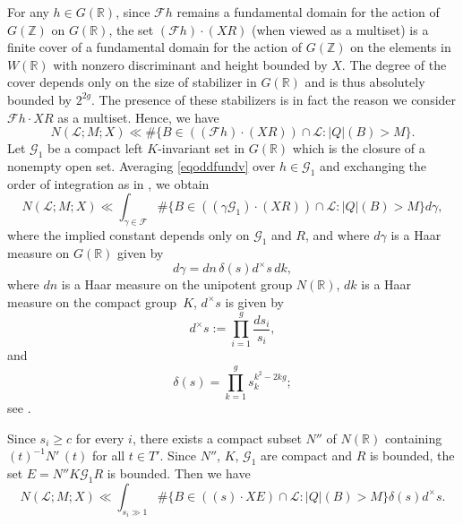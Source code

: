 \documentclass[11pt]{article}
\def\Z{{\mathbb Z}}
\def\R{{\mathbb R}}
\def\FF{{\mathcal F}}
\def\Z{{\mathbb Z}}
\def\GG{{\mathcal G}}
\def\LL{{\mathcal L}}
\begin{document}
For any $h\in G(\R)$, since $\FF h$ remains a fundamental domain for
the action of $G(\Z)$ on $G(\R)$, the set $(\FF h)\cdot (XR)$ (when
viewed as a multiset) is a finite cover of a fundamental domain for
the action of $G(\Z)$ on the elements in $W(\R)$ with nonzero
discriminant and height bounded by $X$. The degree of the cover
depends only on the size of stabilizer in $G(\R)$ and is thus
absolutely bounded by $2^{2g}$. The presence of these stabilizers is
in fact the reason we consider $\FF h\cdot XR$ as a multiset. Hence,
we have
\begin{equation}\label{eqoddfundv}
  N(\LL;M;X)\ll \#\{B\in ((\FF h)\cdot (XR))\cap\LL:|Q|(B)>M\}.
\end{equation}
Let $\GG_1$ be a compact left $K$-invariant set in $G(\R)$ which is the
closure of a nonempty open set.
Averaging \eqref{eqoddfundv} over $h\in \GG_1$ and exchanging the
order of integration as in \cite[\S10.1]{BG2}, we obtain
\begin{equation}
  N(\LL;M;X)\ll \int_{\gamma\in\FF} \#\{B\in((\gamma \GG_1)\cdot (XR))\cap\LL:|Q|(B)>M\}
  d\gamma,
\end{equation}
where the implied constant depends only on $\GG_1$ and $R$, and where $d\gamma$ is a Haar measure on $G(\R)$ given by
$$
d\gamma=dn\,\delta(s)d^\times s\,dk,
$$ where $dn$ is a Haar measure on the unipotent group $N(\R)$,
$dk$ is a Haar measure on the compact group~$K$, $d^\times s$ is
given by
$$
d^\times s:=\prod_{i=1}^g\frac{ds_i}{s_i},
$$
and
\begin{equation}\label{eqhaarodd}
\delta(s)=\prod_{k=1}^g s_k^{k^2-2kg};
\end{equation}
see \cite[(10.7)]{BG2}.

Since $s_i\geq c$ for every $i$, there exists a compact subset $N''$
of $N(\R)$ containing $(t)^{-1}N'\,(t)$ for all $t\in T'$. Since
$N''$, $K$, $\GG_1$ are compact and $R$ is bounded, the set $E=N''K\GG_1R$
is bounded. Then we have
\begin{equation}\label{eq:RE}
N(\LL;M;X)\ll \int_{s_i\gg 1} \#\{B\in((s)\cdot XE)\cap\LL:|Q|(B)>M\}\delta(s)d^\times s.
\end{equation}
\end{document}
